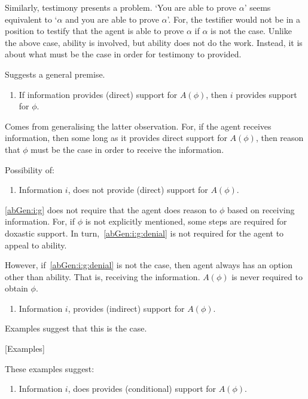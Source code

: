 \documentclass[10pt]{article}
\begin{document}
Similarly, testimony presents a problem.
`You are able to prove \(\alpha\)' seems equivalent to `\(\alpha\) and you are able to prove \(\alpha\)'.
For, the testifier would not be in a position to testify that the agent is able to prove \(\alpha\) if \(\alpha\) is not the case.
Unlike the above case, ability is involved, but ability does not do the work.
Instead, it is about what must be the case in order for testimony to provided.

Suggests a general premise.

\begin{enumerate}
\item\label{abGen:i:g} If information provides (direct) support for \(A(\phi)\), then \(i\) provides support for \(\phi\).
\end{enumerate}

Comes from generalising the latter observation.
For, if the agent receives information, then some long as it provides direct support for \(A(\phi)\), then reason that \(\phi\) must be the case in order to receive the information.

Possibility of:

\begin{enumerate}
\item\label{abGen:i:g:denial} Information \(i\), does not provide (direct) support for \(A(\phi)\).
\end{enumerate}

\ref{abGen:i:g} does not require that the agent does reason to \(\phi\) based on receiving information.
For, if \(\phi\) is not explicitly mentioned, some steps are required for doxastic support.
In turn,~\ref{abGen:i:g:denial} is not required for the agent to appeal to ability.

However, if~\ref{abGen:i:g:denial} is not the case, then agent always has an option other than ability.
That is, receiving the information.
\(A(\phi)\) is never required to obtain \(\phi\).

\begin{enumerate}
\item\label{abGen:i:indirect} Information \(i\), provides (indirect) support for \(A(\phi)\).
\end{enumerate}

Examples suggest that this is the case.

[Examples]

These examples suggest:

\begin{enumerate}
\item\label{abGen:i:conditional} Information \(i\), does provides (conditional) support for \(A(\phi)\).
\end{enumerate}
\end{document}
